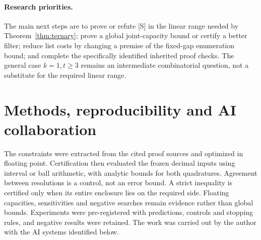 \documentclass[11pt]{article}
\theoremstyle{plain}
\begin{document}
\paragraph{Research priorities.}
The main next steps are to prove or refute [S] in the linear range needed by Theorem~\ref{thm:ternary}; prove a global joint-capacity bound or certify a better filter; reduce list costs by changing a premise of the fixed-gap enumeration bound; and complete the specifically identified inherited proof checks. The general case $k=1,t\ge3$ remains an intermediate combinatorial question, not a substitute for the required linear range.

\section{Methods, reproducibility and AI collaboration}

The constraints were extracted from the cited proof sources and optimized in floating point. Certification then evaluated the frozen decimal inputs using interval or ball arithmetic, with analytic bounds for both quadratures. Agreement between resolutions is a control, not an error bound. A strict inequality is certified only when its entire enclosure lies on the required side. Floating capacities, sensitivities and negative searches remain evidence rather than global bounds. Experiments were pre-registered with predictions, controls and stopping rules, and negative results were retained. The work was carried out by the author with the AI systems identified below.
\end{document}
